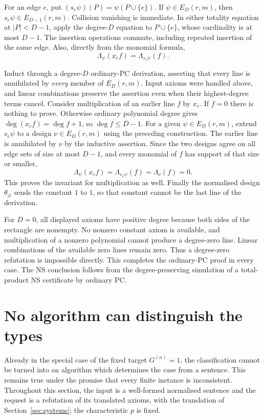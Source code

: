 \documentclass[11pt,a4paper]{article}
\theoremstyle{definition}\newtheorem{definition}[theorem]{Definition}
\theoremstyle{remark}\newtheorem{remark}[theorem]{Remark}
\begin{document}
For an edge $e$, put $(s_e\psi)(P)=\psi(P\cup\{e\})$.
If $\psi\in E_D(r,m)$, then $s_e\psi\in E_{D-1}(r,m)$.
Collision vanishing is immediate.  In either totality equation at
$|P|<D-1$, apply the degree-$D$ equation to $P\cup\{e\}$, whose
cardinality is at most $D-1$.  The insertion operations commute,
including repeated insertion of the same edge.  Also, directly from
the monomial formula,
\[
 \Lambda_\psi(x_ef)=\Lambda_{s_e\psi}(f).
\]

Induct through a degree-$D$ ordinary-PC derivation, asserting that every
line is annihilated by \emph{every} member of $E_D(r,m)$.  Input axioms
were handled above, and linear combinations preserve the assertion
even when their highest-degree terms cancel.  Consider multiplication
of an earlier line $f$ by $x_e$.  If $f=0$ there is nothing to prove.
Otherwise ordinary polynomial degree gives
$\deg(x_ef)=\deg f+1$, so $\deg f\leq D-1$.
For a given $\psi\in E_D(r,m)$, extend $s_e\psi$ to a design
$\nu\in E_D(r,m)$ using the preceding construction.  The earlier line
is annihilated by $\nu$ by the inductive assertion.  Since the two
designs agree on all edge sets of size at most $D-1$, and every monomial
of $f$ has support of that size or smaller,
\[
 \Lambda_\psi(x_ef)=\Lambda_{s_e\psi}(f)=\Lambda_\nu(f)=0.
\]
This proves the invariant for multiplication as well.  Finally the
normalised design $\theta_{\varnothing}$ sends the constant $1$ to $1$,
so that constant cannot be the last line of the derivation.

For $D=0$, all displayed axioms have positive degree because both sides
of the rectangle are nonempty.  No nonzero constant axiom is available,
and multiplication of a nonzero polynomial cannot produce a degree-zero
line.  Linear combinations of the available zero lines remain zero.
Thus a degree-zero refutation is impossible directly.  This completes
the ordinary-PC proof in every case.  The NS conclusion follows from
the degree-preserving simulation of a total-product NS certificate by
ordinary PC.

\section{No algorithm can distinguish the types}\label{sec:undecidability}
Already in the special case of the fixed target $G^{(n)}=1$, the
classification cannot be turned into an algorithm
which determines the case from a sentence. This remains true under the
promise that every finite instance is inconsistent. Throughout this section,
the input is a well-formed normalised sentence and the request is a
refutation of its translated axioms, with the translation of
Section~\ref{sec:systems}; the characteristic $p$ is fixed.
\end{document}
